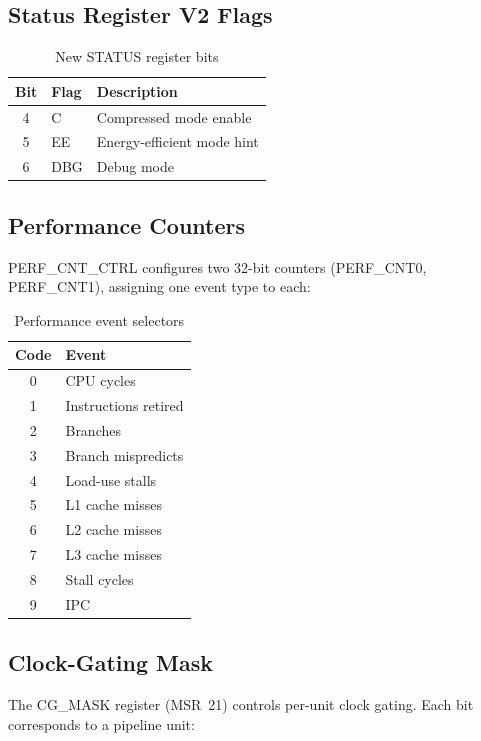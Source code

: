\documentclass[11pt,a4paper]{article}
\begin{document}
\subsection{Status Register V2 Flags}

\begin{table}[H]
\centering
\caption{New STATUS register bits}
\begin{tabular}{cll}
\toprule
Bit & Flag & Description \\
\midrule
4 & C & Compressed mode enable \\
5 & EE & Energy-efficient mode hint \\
6 & DBG & Debug mode \\
\bottomrule
\end{tabular}
\end{table}

\subsection{Performance Counters}

PERF\_CNT\_CTRL configures two 32-bit counters (PERF\_CNT0, PERF\_CNT1),
assigning one event type to each:

\begin{table}[H]
\centering
\caption{Performance event selectors}
\begin{tabular}{cl}
\toprule
Code & Event \\
\midrule
0 & CPU cycles \\
1 & Instructions retired \\
2 & Branches \\
3 & Branch mispredicts \\
4 & Load-use stalls \\
5 & L1 cache misses \\
6 & L2 cache misses \\
7 & L3 cache misses \\
8 & Stall cycles \\
9 & IPC \\
\bottomrule
\end{tabular}
\end{table}

\subsection{Clock-Gating Mask}

The CG\_MASK register (MSR~21) controls per-unit clock gating. Each bit
corresponds to a pipeline unit:
\end{document}

